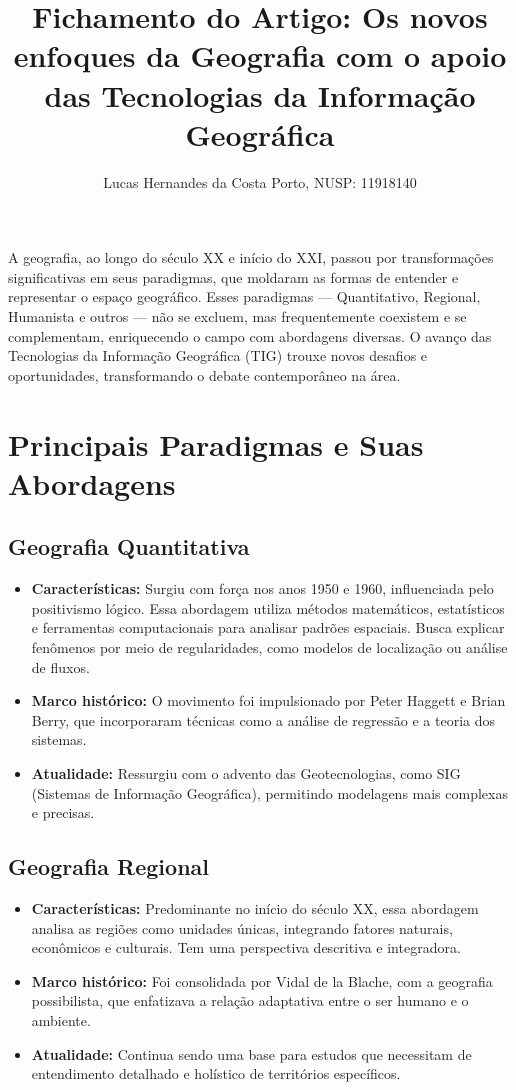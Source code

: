 \documentclass[
]{article}
\title{Fichamento do Artigo: Os novos enfoques da Geografia com o apoio das Tecnologias da Informação Geográfica}
\author{Lucas Hernandes da Costa Porto, NUSP: 11918140}
\date{}
\begin{document}
\maketitle

A geografia, ao longo do século XX e início do XXI, passou por transformações significativas em seus paradigmas, que moldaram as formas de entender e representar o espaço geográfico. Esses paradigmas — Quantitativo, Regional, Humanista e outros — não se excluem, mas frequentemente coexistem e se complementam, enriquecendo o campo com abordagens diversas. O avanço das Tecnologias da Informação Geográfica (TIG) trouxe novos desafios e oportunidades, transformando o debate contemporâneo na área.

\section{Principais Paradigmas e Suas Abordagens}

\subsection{Geografia Quantitativa}

\begin{itemize}
  \item \textbf{Características:} Surgiu com força nos anos 1950 e 1960, influenciada pelo positivismo lógico. Essa abordagem utiliza métodos matemáticos, estatísticos e ferramentas computacionais para analisar padrões espaciais. Busca explicar fenômenos por meio de regularidades, como modelos de localização ou análise de fluxos.
  \item \textbf{Marco histórico:} O movimento foi impulsionado por Peter Haggett e Brian Berry, que incorporaram técnicas como a análise de regressão e a teoria dos sistemas.
  \item \textbf{Atualidade:} Ressurgiu com o advento das Geotecnologias, como SIG (Sistemas de Informação Geográfica), permitindo modelagens mais complexas e precisas.
\end{itemize}

\subsection{Geografia Regional}

\begin{itemize}
  \item \textbf{Características:} Predominante no início do século XX, essa abordagem analisa as regiões como unidades únicas, integrando fatores naturais, econômicos e culturais. Tem uma perspectiva descritiva e integradora.
  \item \textbf{Marco histórico:} Foi consolidada por Vidal de la Blache, com a geografia possibilista, que enfatizava a relação adaptativa entre o ser humano e o ambiente.
  \item \textbf{Atualidade:} Continua sendo uma base para estudos que necessitam de entendimento detalhado e holístico de territórios específicos.
\end{itemize}
\end{document}
